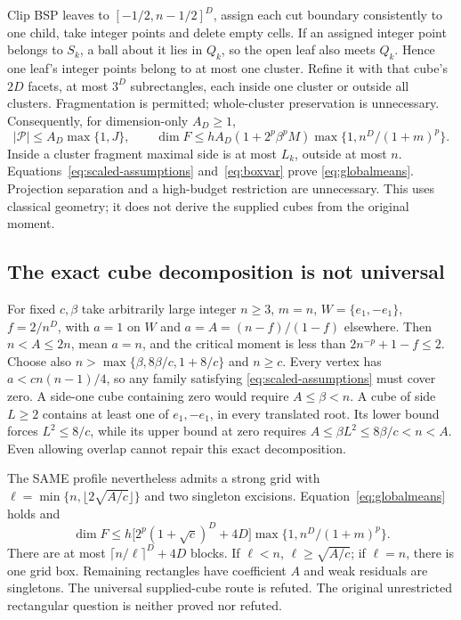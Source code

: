 Clip BSP leaves to $[-1/2,n-1/2]^D$, assign each cut boundary consistently
to one child, take integer points and delete empty cells. If an assigned
integer point belongs to $S_k$, a ball about it lies in $Q_k$, so the open
leaf also meets $Q_k$. Hence one leaf's integer points belong to at most one
cluster. Refine it with that cube's $2D$ facets, at most $3^D$ subrectangles,
each inside one cluster or outside all clusters. Fragmentation is permitted;
whole-cluster preservation is unnecessary. Consequently, for dimension-only
$A_D\geq1$,
\[
 |\mathcal P|\leq A_D\max\{1,J\},\qquad
 \dim F\leq h A_D(1+2^p\beta^pM)\max\{1,n^D/(1+m)^p\}.
\]
Inside a cluster fragment maximal side is at most $L_k$, outside at most
$n$. Equations~\eqref{eq:scaled-assumptions} and~\eqref{eq:boxvar} prove
\eqref{eq:globalmeans}. Projection separation and a high-budget restriction
are unnecessary. This uses classical geometry; it does not derive the
supplied cubes from the original moment.

\subsection{The exact cube decomposition is not universal}
For fixed $c,\beta$ take arbitrarily large integer $n\geq3$, $m=n$,
$W=\{e_1,-e_1\}$, $f=2/n^D$, with $a=1$ on $W$ and
$a=A=(n-f)/(1-f)$ elsewhere. Then $n<A\leq2n$, mean $a=n$, and the
critical moment is less than $2n^{-p}+1-f\leq2$. Choose also
$n>\max\{\beta,8\beta/c,1+8/c\}$ and $n\geq c$.
Every vertex has $a<cn(n-1)/4$, so any family satisfying
\eqref{eq:scaled-assumptions} must cover zero. A side-one cube containing
zero would require $A\leq\beta<n$. A cube of side $L\geq2$ contains at
least one of $e_1,-e_1$, in every translated root. Its lower bound forces
$L^2\leq8/c$, while its upper bound at zero requires
$A\leq\beta L^2\leq8\beta/c<n<A$. Even allowing overlap cannot repair
this exact decomposition.

The SAME profile nevertheless admits a strong grid with
$\ell=\min\{n,\lfloor2\sqrt{A/c}\rfloor\}$ and two singleton excisions.
Equation~\eqref{eq:globalmeans} holds and
\[
 \dim F\leq h\bigl[2^p(1+\sqrt c)^D+4D\bigr]
                  \max\{1,n^D/(1+m)^p\}.
\]
There are at most $\lceil n/\ell\rceil^D+4D$ blocks. If $\ell<n$,
$\ell\geq\sqrt{A/c}$; if $\ell=n$, there is one grid box. Remaining
rectangles have coefficient $A$ and weak residuals are singletons. The
universal supplied-cube route is refuted. The original unrestricted
rectangular question is neither proved nor refuted.
